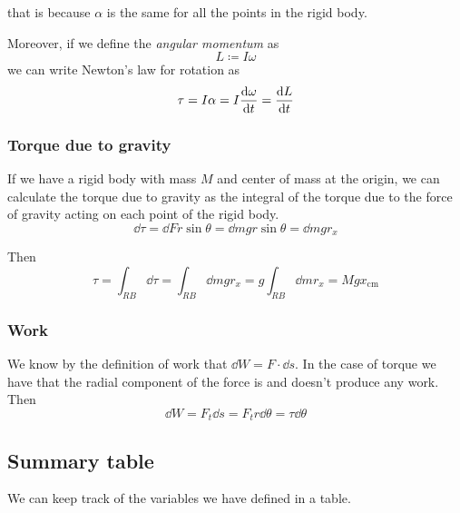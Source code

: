 \documentclass[14pt]{extarticle}
\begin{document}
that is because $\alpha$ is the same for all the points in the rigid body.

Moreover, if we define the \emph{angular momentum} as
\begin{equation}
    L \coloneq I \omega
\end{equation}
we can write Newton's law for rotation as
\begin{equation}
    \tau = I \alpha = I \dv{\omega}{t} = \dv{L}{t}
\end{equation}

\subsubsection{Torque due to gravity}

If we have a rigid body with mass $M$ and center of mass at the origin, we can calculate the torque due to gravity as the integral of the torque due to the force of gravity acting on each point of the rigid body.
\begin{equation}
    \dd{\tau} = \dd{F} r \sin \theta = \dd{m} g r \sin \theta = \dd{m} g r_x
\end{equation}

Then
\begin{equation}
    \tau = \int_{RB} \dd{\tau} = \int_{RB} \dd{m} g r_x = g \int_{RB} \dd{m} r_x = M g x_{\text{cm}}
\end{equation}

\subsubsection{Work}

We know by the definition of work that $\dd{W} = F \cdot \dd{s}$. In the case of torque we have that the radial component of the force is  and doesn't produce any work. Then
\begin{equation}
    \dd{W} = F_t \dd{s} = F_t r \dd{\theta} = \tau \dd{\theta}
\end{equation}

\subsection{Summary table}

We can keep track of the variables we have defined in a table.
\end{document}
